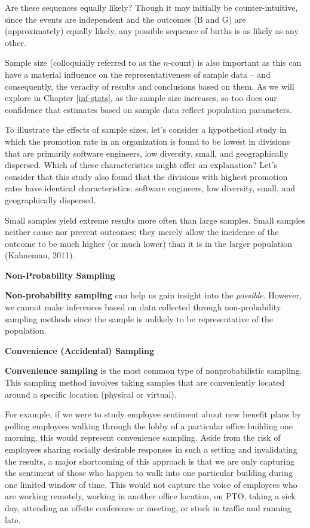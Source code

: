 \documentclass[
]{book}
\begin{document}
Are these sequences equally likely? Though it may initially be counter-intuitive, since the events are independent and the outcomes (B and G) are (approximately) equally likely, any possible sequence of births is as likely as any other.

Sample size (colloquially referred to as the \(n\)-count) is also important as this can have a material influence on the representativeness of sample data -- and consequently, the veracity of results and conclusions based on them. As we will explore in Chapter \ref{inf-stats}, as the sample size increases, so too does our confidence that estimates based on sample data reflect population parameters.

To illustrate the effects of sample sizes, let's consider a hypothetical study in which the promotion rate in an organization is found to be lowest in divisions that are primarily software engineers, low diversity, small, and geographically dispersed. Which of these characteristics might offer an explanation? Let's consider that this study also found that the divisions with highest promotion rates have identical characteristics: software engineers, low diversity, small, and geographically dispersed.

Small samples yield extreme results more often than large samples. Small samples neither cause nor prevent outcomes; they merely allow the incidence of the outcome to be much higher (or much lower) than it is in the larger population (Kahneman, 2011).

\textbf{Non-Probability Sampling}

\textbf{Non-probability sampling} can help us gain insight into the \emph{possible}. However, we cannot make inferences based on data collected through non-probability sampling methods since the sample is unlikely to be representative of the population.

\textbf{Convenience (Accidental) Sampling}

\textbf{Convenience sampling} is the most common type of nonprobabilistic sampling. This sampling method involves taking samples that are conveniently located around a specific location (physical or virtual).

For example, if we were to study employee sentiment about new benefit plans by polling employees walking through the lobby of a particular office building one morning, this would represent convenience sampling. Aside from the risk of employees sharing socially desirable responses in such a setting and invalidating the results, a major shortcoming of this approach is that we are only capturing the sentiment of those who happen to walk into one particular building during one limited window of time. This would not capture the voice of employees who are working remotely, working in another office location, on PTO, taking a sick day, attending an offsite conference or meeting, or stuck in traffic and running late.
\end{document}
